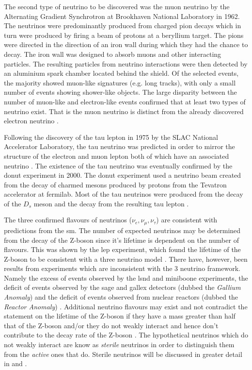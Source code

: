The second type of neutrino to be discovered was the muon neutrino by the Alternating Gradient Synchrotron at Brookhaven National Laboratory in 1962. The neutrinos were predominantly produced from charged pion decays which in turn were produced by firing a beam of protons at a beryllium target. The pions were directed in the direction of an iron wall during which they had the chance to decay. The iron wall was designed to absorb muons and other interacting particles. The resulting particles from neutrino interactions were then detected by an aluminium spark chamber located behind the shield. Of the selected events, the majority showed muon-like signatures (e.g. long tracks), with only a small number of events showing shower-like objects. The large disparity between the number of muon-like and electron-like events confirmed that at least two types of neutrino exist. That is the muon neutrino is distinct from the already discovered electron neutrino \cite{Muon_neutrino_discovery}. 

Following the discovery of the tau lepton in 1975 by the SLAC National Accelerator Laboratory, the tau neutrino was predicted in order to mirror the structure of the electron and muon lepton both of which have an associated neutrino \cite{tau_lepton_discovery}. The existence of the tau neutrino was eventually confirmed by the \Gls{donut} experiment in 2000. The \Gls{donut} experiment used a neutrino beam created from the decay of charmed mesons produced by protons from the  Tevatron accelerator at \gls{fermilab}. Most of the tau neutrinos were produced from the decay of the $D_s$ meson and the decay from the resulting tau lepton \cite{DONUT}.

The three confirmed flavours of neutrinos ($\nu_e, \nu_{\mu}, \nu_{\tau}$) are consistent with predictions from the \Gls{sm}. The number of expected neutrinos may be determined from the decay of the Z-boson since it's lifetime is dependent on the number of flavours. This was shown by the \gls{lep} experiment, which found the lifetime of the Z-boson to be consistent with a three neutrino model \cite{Zboson_number_of_neutrinos}\cite{LEP}. There have, however, been results from experiments which are inconsistent with the 3 neutrino framework. Namely the excess of events observed by the \gls{lsnd} and \gls{miniboone} experiments, the deficit of events observed by the \gls{sage} and \gls{gallex} detectors (dubbed the \textit{Gallium Anomaly}) and the deficit of events observed from nuclear reactors (dubbed the \textit{Reactor Anomaly}) \cite{LSND_excess} \cite{MiniBooNE_excess} \cite{GALLEX} \cite{Gallex_reanalysis} \cite{SAGE} \cite{Reactor_anomaly}. Additional neutrino flavours may exist and not contradict the statement on the lifetime of the Z-boson if they have a mass greater than half that of the Z-boson and/or they do not weakly interact and hence don't contribute to the decay rate of the Z-boson \cite{Zboson_number_of_neutrinos}. The hypothetical neutrinos which do not weakly interact are know as \textit{sterile} neutrinos in order to distinguish them from the \textit{active} ones that do. Sterile neutrinos will be discussed in greater detail in  and .

